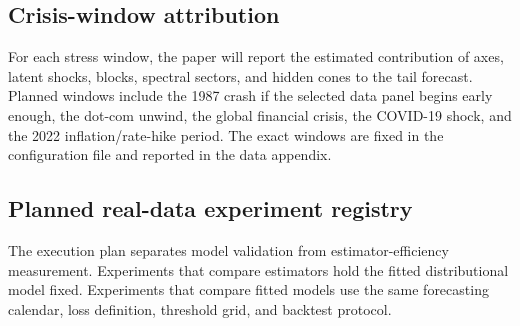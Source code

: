 \begin{table}[p]
\centering

\caption[VaR and ES backtest]{VaR and ES
backtest results. Values are \xx{} placeholders. The final table will compare
independent, latent-shock, block, copula, spectral, historical, and
parametric benchmarks across exception rate, independence, conditional
coverage, ES residual, and comparative scoring metrics.}
\label{tab:var-es-backtest-placeholder}
\end{table}

\subsection{Crisis-window attribution}

For each stress window, the paper will report the estimated contribution of
axes, latent shocks, blocks, spectral sectors, and hidden cones to the tail
forecast. Planned windows include the 1987 crash if the selected data panel
begins early enough, the dot-com unwind, the global financial crisis, the
COVID-19 shock, and the 2022 inflation/rate-hike period. The exact windows
are fixed in the configuration file and reported in the data appendix.

\begin{table}[p]
\centering

\caption[Crisis attribution]{Crisis-window
tail attribution. Values are \xx{} placeholders. The final table will
decompose forecast tail probability into marginal axes, latent common shocks,
blocks, spectral sectors, and hidden cones by stress period.}
\label{tab:crisis-attribution-placeholder}
\end{table}


\subsection{Planned real-data experiment registry}

The execution plan separates model validation from estimator-efficiency
measurement. Experiments that compare estimators hold the fitted distributional
model fixed. Experiments that compare fitted models use the same forecasting
calendar, loss definition, threshold grid, and backtest protocol.

\begin{table}[p]
\centering

\caption[Real-data experiment registry]{Planned real-data experiment registry. Experiment descriptors, estimator
candidates, forecast levels, and output identifiers are populated; the
status/outcome column remains \xx{} until the run registry is populated.}
\label{tab:realdata-experiments-current}
\end{table}

